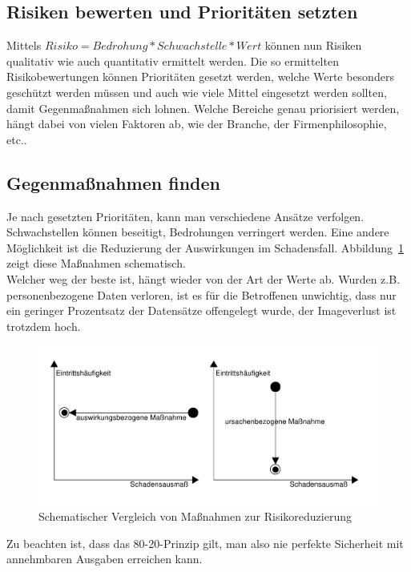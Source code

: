 \subsection{Risiken bewerten und Prioritäten setzten}
Mittels $ Risiko = Bedrohung * Schwachstelle * Wert $ können nun Risiken qualitativ wie auch quantitativ ermittelt werden. Die so ermittelten Risikobewertungen können Prioritäten gesetzt werden, welche Werte besonders geschützt werden müssen und auch wie viele Mittel eingesetzt werden sollten, damit Gegenmaßnahmen sich lohnen. Welche Bereiche genau priorisiert werden, hängt dabei von vielen Faktoren ab, wie der Branche, der Firmenphilosophie, etc..
\subsection{Gegenmaßnahmen finden}
Je nach gesetzten Prioritäten, kann man verschiedene Ansätze verfolgen. Schwachstellen können beseitigt, Bedrohungen verringert werden. Eine andere Möglichkeit ist die Reduzierung der Auswirkungen im Schadensfall. Abbildung~\ref{reduzierungHuefigkeitAusmass} zeigt diese Maßnahmen schematisch.\\
Welcher weg der beste ist, hängt wieder von der Art der Werte ab. Wurden z.B. personenbezogene Daten verloren, ist es für die Betroffenen unwichtig, dass nur ein geringer Prozentsatz der Datensätze offengelegt wurde, der Imageverlust ist trotzdem hoch.\\

\begin{figure}[h]
\includegraphics[scale=0.6]{images/reduzierungHuefigkeitAusmass.pdf}
\caption{Schematischer Vergleich von Maßnahmen zur Risikoreduzierung}
\label{reduzierungHuefigkeitAusmass}
\end{figure}

Zu beachten ist, dass das 80-20-Prinzip gilt, man also nie perfekte Sicherheit mit annehmbaren Ausgaben erreichen kann.
